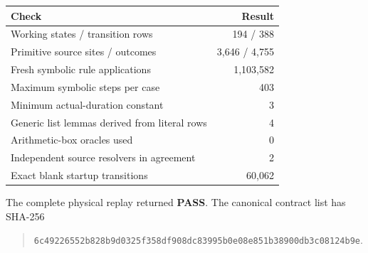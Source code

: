 \begin{center}
\begin{tabular}{@{}lr@{}}
\toprule
Check & Result\\\midrule
Working states / transition rows & 194 / 388\\
Primitive source sites / outcomes & 3,646 / 4,755\\
Fresh symbolic rule applications & 1,103,582\\
Maximum symbolic steps per case & 403\\
Minimum actual-duration constant & 3\\
Generic list lemmas derived from literal rows & 4\\
Arithmetic-box oracles used & 0\\
Independent source resolvers in agreement & 2\\
Exact blank startup transitions & 60,062\\
\bottomrule
\end{tabular}
\end{center}
The complete physical replay returned \textbf{PASS}. The canonical contract
list has SHA-256
\begin{quote}\small
\nolinkurl{6c49226552b828b9d0325f358df908dc83995b0e08e851b38900db3c08124b9e}.
\end{quote}
